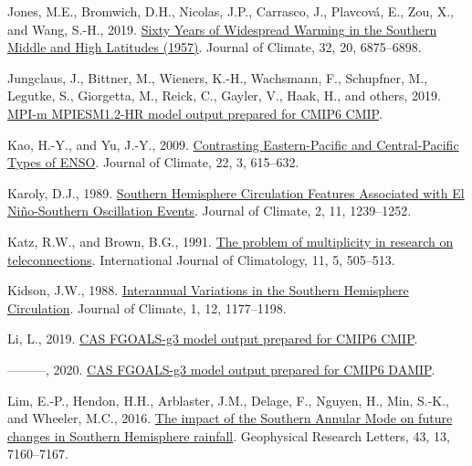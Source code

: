 \documentclass[12pt,oneside]{reedthesis}
\newlength{\cslhangindent}
\newenvironment{CSLReferences}[2] %
 {%
  \setlength{\parindent}{0pt}
  \ifodd #1 \everypar{\setlength{\hangindent}{\cslhangindent}}\ignorespaces\fi
  \ifnum #2 > 0
  \setlength{\parskip}{#2\baselineskip}
  \fi
 }%
 {}
\begin{document}
\begin{CSLReferences}{1}{0}
\leavevmode{}%
Jones, M.E., Bromwich, D.H., Nicolas, J.P., Carrasco, J., Plavcová, E., Zou, X., and Wang, S.-H., 2019. \href{https://doi.org/10.1175/JCLI-D-18-0565.1}{Sixty {Years} of {Widespread Warming} in the {Southern Middle} and {High Latitudes} (1957)}. Journal of Climate, 32, 20, 6875--6898.

\leavevmode{}%
Jungclaus, J., Bittner, M., Wieners, K.-H., Wachsmann, F., Schupfner, M., Legutke, S., Giorgetta, M., Reick, C., Gayler, V., Haak, H., and others, 2019. \href{https://doi.org/10.22033/ESGF/CMIP6.741}{MPI-m MPIESM1.2-HR model output prepared for CMIP6 CMIP}.

\leavevmode{}%
Kao, H.-Y., and Yu, J.-Y., 2009. \href{https://doi.org/10.1175/2008JCLI2309.1}{Contrasting {Eastern-Pacific} and {Central-Pacific Types} of {ENSO}}. Journal of Climate, 22, 3, 615--632.

\leavevmode{}%
Karoly, D.J., 1989. \href{https://doi.org/10.1175/1520-0442(1989)002\%3C1239:SHCFAW\%3E2.0.CO;2}{Southern {Hemisphere Circulation Features Associated} with {El Niño-Southern Oscillation Events}}. Journal of Climate, 2, 11, 1239--1252.

\leavevmode{}%
Katz, R.W., and Brown, B.G., 1991. \href{https://doi.org/10.1002/joc.3370110504}{The problem of multiplicity in research on teleconnections}. International Journal of Climatology, 11, 5, 505--513.

\leavevmode{}%
Kidson, J.W., 1988. \href{https://doi.org/10.1175/1520-0442(1988)001\%3C1177:IVITSH\%3E2.0.CO;2}{Interannual {Variations} in the {Southern Hemisphere Circulation}}. Journal of Climate, 1, 12, 1177--1198.

\leavevmode{}%
Li, L., 2019. \href{https://doi.org/10.22033/ESGF/CMIP6.1783}{CAS FGOALS-g3 model output prepared for CMIP6 CMIP}.

\leavevmode{}%
---------, 2020. \href{https://doi.org/10.22033/ESGF/CMIP6.2048}{CAS FGOALS-g3 model output prepared for CMIP6 DAMIP}.

\leavevmode{}%
Lim, E.-P., Hendon, H.H., Arblaster, J.M., Delage, F., Nguyen, H., Min, S.-K., and Wheeler, M.C., 2016. \href{https://doi.org/10.1002/2016GL069453}{The impact of the {Southern Annular Mode} on future changes in {Southern Hemisphere} rainfall}. Geophysical Research Letters, 43, 13, 7160--7167.


\end{CSLReferences}
\end{document}

